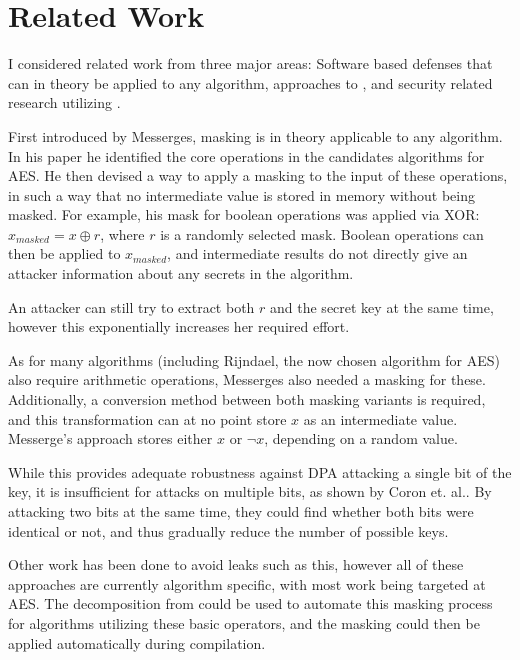 \section{Related Work}
\label{sec:related-work}
I considered related work from three major areas:
Software based \poweranalysis{} defenses that can in theory be applied to any algorithm, approaches to \dual{}, and security related research utilizing \llvm{}.

First introduced by Messerges\cite{messerges2000securing}, masking is in theory applicable to any algorithm.
In his paper he identified the core operations in the candidates algorithms for AES.
He then devised a way to apply a masking to the input of these operations, in such a way that no intermediate value is stored in memory without being masked.
For example, his mask for boolean operations was applied via XOR: $x_{masked} = x \oplus r$, where $r$ is a randomly selected mask.
Boolean operations can then be applied to $x_{masked}$, and intermediate results do not directly give an attacker information about any secrets in the algorithm.

An attacker can still try to extract both $r$ and the secret key at the same time, however this exponentially increases her required effort.

As for many algorithms (including Rijndael, the now chosen algorithm for AES) also require arithmetic operations, Messerges also needed a masking for these.
Additionally, a conversion method between both masking variants is required, and this transformation can at no point store $x$ as an intermediate value.
Messerge's approach stores either $x$ or $\neg{x}$, depending on a random value.

While this provides adequate robustness against DPA attacking a single bit of the key, it is insufficient for attacks on multiple bits, as shown by Coron et. al.\cite{coron2000boolean}.
By attacking two bits at the same time, they could find whether both bits were identical or not, and thus gradually reduce the number of possible keys.

Other work has been done to avoid leaks such as this\cite{akkar2001implementation}\cite{rivain2010provably}, however all of these approaches are currently algorithm specific, with most work being targeted at AES.
The decomposition from \cite{messerges2000securing} could be used to automate this masking process for algorithms utilizing these basic operators, and the masking could then be applied automatically during compilation.

